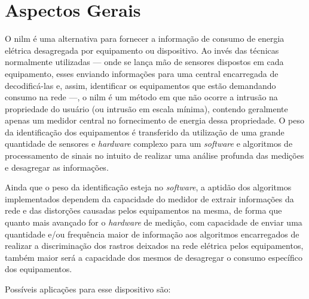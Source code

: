 \section{Aspectos Gerais}
\label{sec:nilm_aspec_gerais}

O \gls{nilm} é uma alternativa para fornecer a informação de consumo
de energia elétrica desagregada por equipamento ou dispositivo. Ao
invés das técnicas normalmente utilizadas --- onde se lança mão de
sensores dispostos em cada equipamento, esses enviando informações
para uma central encarregada de decodificá-las e, assim, identificar
os equipamentos que estão demandando consumo na rede ---, o \gls{nilm}
é um método em que não ocorre a intrusão na propriedade do usuário (ou
intrusão em escala mínima), contendo geralmente apenas um medidor
central no fornecimento de energia dessa propriedade. O peso da
identificação dos equipamentos é transferido da utilização de uma
grande quantidade de sensores e \emph{hardware} complexo para um
\emph{software} e algoritmos de processamento de sinais no intuito de
realizar uma análise profunda das medições e desagregar as
informações.

Ainda que o peso da identificação esteja no \emph{software}, a
aptidão dos algoritmos implementados dependem da capacidade do
medidor de extrair informações da rede e das distorções causadas pelos
equipamentos na mesma, de forma que quanto mais avançado for o
\emph{hardware} de medição, com capacidade de enviar uma quantidade e/ou frequência
maior de informação aos algoritmos encarregados de realizar a
discriminação dos rastros deixados na rede elétrica pelos equipamentos,
também maior será a capacidade dos mesmos de desagregar o consumo
específico dos equipamentos.

Possíveis aplicações para esse dispositivo são:

